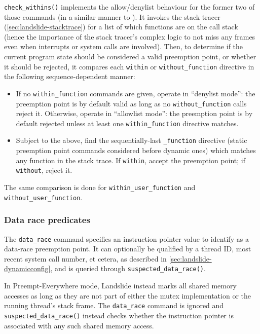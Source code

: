{\tt check\_withins()} implements the allow/denylist behaviour for the former two of those commands
(in a similar manner to  \cite{sealing}).
It invokes the stack tracer (\cref{sec:landslide-stacktrace})
for a list of which functions are on the call stack
(hence the importance of the stack tracer's complex logic to not miss any frames
even when interrupts or system calls are involved).
Then, to determine if the current program state should be considered a valid preemption point,
or whether it should be rejected,
it compares each {\tt within} or {\tt without\_function} directive in the following sequence-dependent manner:

\begin{itemize}
	\item If no {\tt within\_function} commands are given, operate in ``denylist mode'':
		the preemption point is by default valid as long as no {\tt without\_function} calls reject it.
		Otherwise, operate in ``allowlist mode'':
		the preemption point is by default rejected unless at least one {\tt within\_function} directive matches.
	\item Subject to the above, find the sequentially-last {\tt *\_function} directive
		(static preemption point commands considered before dynamic ones)
		which matches any function in the stack trace.
		If {\tt within}, accept the preemption point; if {\tt without}, reject it.
\end{itemize}

The same comparison is done for {\tt within\_user\_function} and {\tt without\_user\_function}.

\subsubsection{Data race predicates}

The {\tt data\_race} command specifies an instruction pointer value to identify as a data-race preemption point.
It can optionally be qualified by a thread ID, most recent system call number, et cetera,
as described in \cref{sec:landslide-dynamicconfig},
and is queried through {\tt suspected\_data\_race()}.

In Preempt-Everywhere mode, Landslide instead marks all shared memory accesses
as long as they are not part of either the mutex implementation or the running thread's stack frame.
The {\tt data\_race} command is ignored and {\tt suspected\_data\_race()}
instead checks whether the instruction pointer is associated with any such shared memory access.

